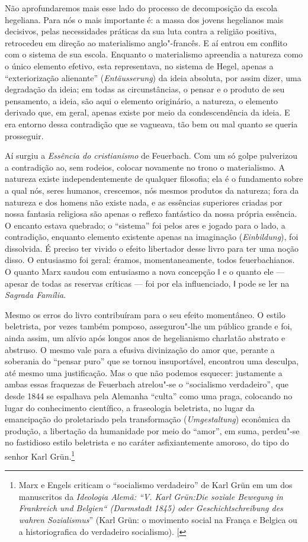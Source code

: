 Não aprofundaremos mais esse lado do processo de decomposição da escola
hegeliana. Para nós o mais importante é: a massa dos jovens hegelianos
mais decisivos, pelas necessidades práticas da sua luta contra a
religião positiva, retrocedeu em direção ao materialismo anglo"-francês.
E aí entrou em conflito com o sistema de sua escola. Enquanto o
materialismo apreendia a natureza como o único elemento efetivo, esta
representava, no sistema
de Hegel,
apenas a ``exteriorização alienante'' (\emph{Entäusserung}) da ideia
absoluta, por assim dizer, uma degradação da ideia; em todas as
circunstâncias, o pensar e o produto de seu pensamento, a ideia, são
aqui o elemento originário, a natureza, o elemento derivado que, em
geral, apenas existe por meio da condescendência da ideia. E era entorno
dessa contradição que se vagueava, tão bem ou mal quanto se queria
prosseguir.

Aí surgiu a \emph{Essência do
cristianismo} de Feuerbach.
Com um só golpe pulverizou a contradição ao, sem rodeios, colocar
novamente no trono o materialismo. A natureza existe independentemente
de qualquer filosofia; ela é o fundamento sobre a qual nós, seres
humanos, crescemos, nós mesmos produtos da natureza; fora da natureza e
dos homens não existe nada, e as essências superiores criadas por nossa
fantasia religiosa são apenas o reflexo fantástico da nossa própria
essência. O encanto estava quebrado; o ``sistema'' foi pelos ares e
jogado para o lado, a contradição, enquanto elemento existente apenas na
imaginação (\emph{Einbildung}), foi dissolvida. É preciso ter vivido o
efeito libertador desse livro para ter uma noção disso. O entusiasmo foi
geral: éramos, momentaneamente, todos feuerbachianos. O quanto Marx
saudou com entusiasmo a nova concepção ǁ e o quanto ele --- apesar de
todas as reservas críticas --- foi por ela influenciado, ǁ pode se ler
na \emph{Sagrada Família}.

Mesmo os erros do livro contribuíram para o seu efeito momentâneo. O
estilo beletrista, por vezes também pomposo, assegurou"-lhe um público
grande e foi, ainda assim, um alívio após longos anos de hegelianismo
charlatão abstrato e abstruso. O mesmo vale para a efusiva divinização
do amor que, perante a soberania do ``pensar puro'' que se tornou
insuportável, encontrou uma desculpa, até mesmo uma justificação. Mas o
que não podemos esquecer: justamente a ambas essas fraquezas
de Feuerbach
atrelou"-se o ``socialismo verdadeiro'', que desde 1844 se espalhava pela
Alemanha ``culta'' como uma praga, colocando no lugar do conhecimento
científico, a fraseologia beletrista, no lugar da emancipação do
proletariado pela transformação (\emph{Umgestaltung}) econômica da
produção, a libertação da humanidade por meio do ``amor'', em suma,
perdeu"-se no fastidioso estilo beletrista e no caráter asfixiantemente
amoroso, do tipo do
senhor Karl
Grün.\footnote{Marx e Engels criticam o ``socialismo
  verdadeiro'' de Karl Grün em um dos manuscritos da \emph{Ideologia
  Alemã: ``V. Karl Grün:Die soziale Bewegung in Frankreich und Belgien``
  (Darmstadt 1845) oder Geschichtschreibung des wahren Sozialismus}''
  (Karl Grün: o movimento social na França e Belgica ou a
  historiografica do verdadeiro socialismo). {[}\versal{N.\,T.}{]}}

